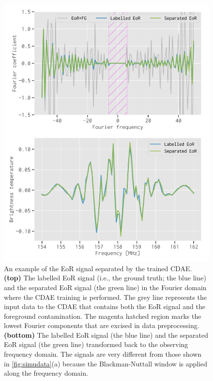 \documentclass[letters,a4paper,fleqn,usenatbib]{mnras}
\begin{document}
\begin{figure}
  \centering
  \includegraphics[width=\columnwidth]{eor-result}
  \caption{\label{fig:result}%
    An example of the EoR signal separated by the trained CDAE.
    \textbf{(top)} The labelled EoR signal (i.e., the ground truth;
    the blue line) and the separated EoR signal (the green line) in the
    Fourier domain where the CDAE training is performed.
    The grey line represents the input data to the CDAE that contains
    both the EoR signal and the foreground contamination.
    The magenta hatched region marks the lowest Fourier components that
    are excised in data preprocessing.
    \textbf{(bottom)} The labelled EoR signal (the blue line) and the
    separated EoR signal (the green line) transformed back to the
    observing frequency domain.
    The signals are very different from those shown in
    \autoref{fig:simudata}(a) because the Blackman-Nuttall window is
    applied along the frequency domain.
  }
\end{figure}


\end{document}
